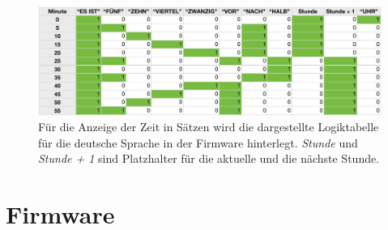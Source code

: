 
\begin{figure}
    \includegraphics[width=\columnwidth]{Abbildungen/Firmware/Logik}
    \caption{Für die Anzeige der Zeit in Sätzen wird die dargestellte Logiktabelle für die deutsche Sprache in der Firmware hinterlegt. \emph{Stunde} und \emph{Stunde + 1} sind Platzhalter für die aktuelle und die nächste Stunde.}
    \label{fig:Logik}
\end{figure}

\section{Firmware}
\label{sec:Firmware}

